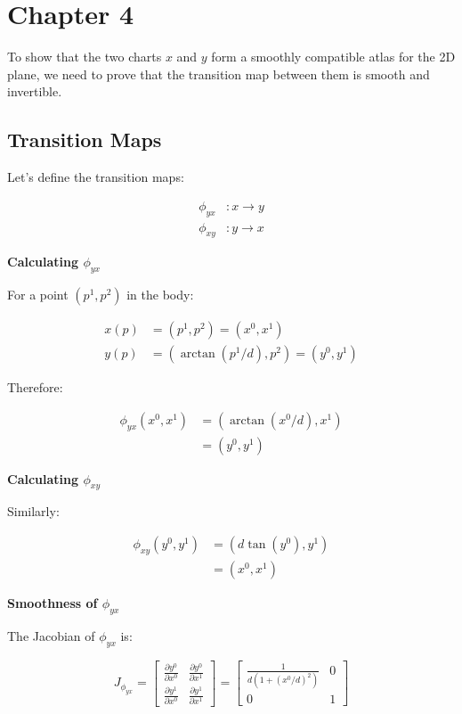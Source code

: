 \documentclass{article}
\begin{document}
\newpage
\section{Chapter 4}
To show that the two charts $x$ and $y$ form a smoothly compatible atlas for the 2D plane, we need to prove that the transition map between them is smooth and invertible.

\subsection{Transition Maps}

Let's define the transition maps:

\begin{align*}
\phi_{yx} &: x \to y \\
\phi_{xy} &: y \to x
\end{align*}

\textbf{Calculating $\phi_{yx}$}

For a point $(p^1, p^2)$ in the body:

\begin{align*}
x(p) &= (p^1, p^2) = (x^0, x^1) \\
y(p) &= (\arctan(p^1/d), p^2) = (y^0, y^1)
\end{align*}

Therefore:

\begin{align*}
\phi_{yx}(x^0, x^1) &= (\arctan(x^0/d), x^1) \\
&= (y^0, y^1)
\end{align*}

\textbf{Calculating $\phi_{xy}$}

Similarly:

\begin{align*}
\phi_{xy}(y^0, y^1) &= (d \tan(y^0), y^1) \\
&= (x^0, x^1)
\end{align*}

\textbf{Smoothness of $\phi_{yx}$}

The Jacobian of $\phi_{yx}$ is:

\[
J_{\phi_{yx}} = \begin{bmatrix}
\frac{\partial y^0}{\partial x^0} & \frac{\partial y^0}{\partial x^1} \\
\frac{\partial y^1}{\partial x^0} & \frac{\partial y^1}{\partial x^1}
\end{bmatrix}
= \begin{bmatrix}
\frac{1}{d(1 + (x^0/d)^2)} & 0 \\
0 & 1
\end{bmatrix}
\]
\end{document}
